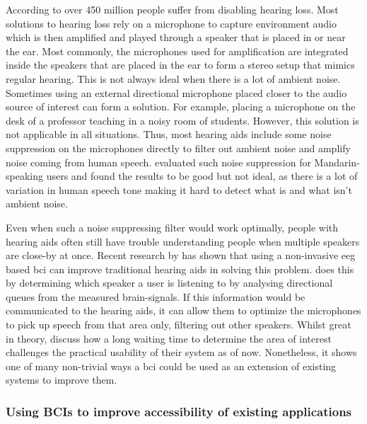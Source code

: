 According to \citet{hearing_aids_noise_reduction} over 450 million people suffer from disabling hearing loss.
Most solutions to hearing loss rely on a microphone to capture environment audio which is then amplified and played through a speaker that is placed in or near the ear.
Most commonly, the microphones used for amplification are integrated inside the speakers that are placed in the ear to form a stereo setup that mimics regular hearing.
This is not always ideal when there is a lot of ambient noise.
Sometimes using an external directional microphone placed closer to the audio source of interest can form a solution.
For example, placing a microphone on the desk of a professor teaching in a noisy room of students.
However, this solution is not applicable in all situations.
Thus, most hearing aids include some noise suppression on the microphones directly to filter out ambient noise and amplify noise coming from human speech.
 evaluated such noise suppression for Mandarin-speaking users and found the results to be good but not ideal, as there is a lot of variation in human speech tone making it hard to detect what is and what isn't ambient noise.

Even when such a noise suppressing filter would work optimally, people with hearing aids often still have trouble understanding people when multiple speakers are close-by at once.
Recent research by \citet{bci_hearing_aid_direction} has shown that using a non-invasive \gls{eeg} based \gls{bci} can improve traditional hearing aids in solving this problem.
 does this by determining which speaker a user is listening to by analysing directional queues from the measured brain-signals.
If this information would be communicated to the hearing aids, it can allow them to optimize the microphones to pick up speech from that area only, filtering out other speakers.
Whilst great in theory, \citet{bci_hearing_aid_direction} discuss how a long waiting time to determine the area of interest challenges the practical usability of their system as of now.
Nonetheless, it shows one of many non-trivial ways a \gls{bci} could be used as an extension of existing systems to improve them.




\subsubsection{Using BCIs to improve accessibility of existing applications}
\label{subsubsec:bci_common_use_cases_improving_existing_system_improve_accessibility}

